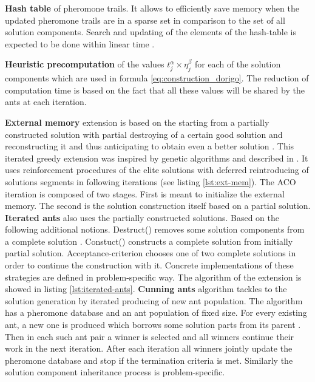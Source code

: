 \textbf{Hash table} of pheromone trails. It allows to efficiently save memory when the updated pheromone trails are in a sparse set in comparison to the set of all solution components. Search and updating of the elements of the hash-table is expected to be done within linear time \cite{hash_table}.

\textbf{Heuristic precomputation} of the values $t_j^\alpha \times \eta_j^\beta$ for each of the solution components which are used in formula \eqref{eq:construction_dorigo}. The reduction of computation time is based on the fact that all these values will be shared by the ants at each iteration.

\textbf{External memory} extension is based on the starting from a partially constructed solution with partial destroying of a certain good solution and reconstructing it and thus anticipating to obtain even a better solution \cite{iterated_greedy}. This iterated greedy extension was inspired by genetic algorithms and described in \cite{external_memory}. It uses reinforcement procedures of the elite solutions with deferred reintroducing of solutions segments in following iterations (see listing \ref{lst:ext-mem}). The ACO iteration is composed of two stages. First is meant to initialize the external memory. The second is the solution construction itself based on a partial solution. \textbf{Iterated ants} also uses the partially constructed solutions. Based on the following additional notions. Destruct() removes some solution components from a complete solution \cite{iterated_ants}. Constuct() constructs a complete solution from initially partial solution. Acceptance-criterion chooses one of two complete solutions in order to continue the construction with it. Concrete implementations of these strategies are defined in problem-specific way. The algorithm of the extension is showed in listing \ref{lst:iterated-ants}. \textbf{Cunning ants} algorithm tackles to the solution generation by iterated producing of new ant population. The algorithm has a pheromone database and an ant population of fixed size. For every existing ant, a new one is produced which borrows some solution parts from its parent \cite{cunning_ants}. Then in each such ant pair a winner is selected and all winners continue their work in the next iteration. After each iteration all winners jointly update the pheromone database and stop if the termination criteria is met. Similarly the solution component inheritance process is problem-specific. 


